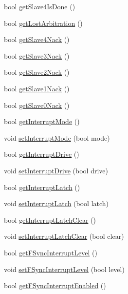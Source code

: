 \begin{DoxyCompactItemize}
\item 
bool \hyperlink{class_m_p_u6050_a105aefe645e7021f9ba4397e9df4114c}{get\+Slave4\+Is\+Done} ()
\item 
bool \hyperlink{class_m_p_u6050_acd775c72f85dabfc6f8fba43da096c6d}{get\+Lost\+Arbitration} ()
\item 
bool \hyperlink{class_m_p_u6050_ae9882b425cbdced4de325b608d896e10}{get\+Slave4\+Nack} ()
\item 
bool \hyperlink{class_m_p_u6050_a55f24d2f2b13d6e28a7c8b6bf2913520}{get\+Slave3\+Nack} ()
\item 
bool \hyperlink{class_m_p_u6050_af4b5101dab501d6df2e0cae909120771}{get\+Slave2\+Nack} ()
\item 
bool \hyperlink{class_m_p_u6050_a65cc9d75ff347b146414685fb83fa451}{get\+Slave1\+Nack} ()
\item 
bool \hyperlink{class_m_p_u6050_a74511edfcada3fb21c3327a0c846c72a}{get\+Slave0\+Nack} ()
\item 
bool \hyperlink{class_m_p_u6050_a58da1dfb39eb34e3a09a9b0bf4d87f29}{get\+Interrupt\+Mode} ()
\item 
void \hyperlink{class_m_p_u6050_a003a098a1521c5ef4df50c0a8a2d47ab}{set\+Interrupt\+Mode} (bool mode)
\item 
bool \hyperlink{class_m_p_u6050_af66e6c7b1885dcf452e73371790fddfd}{get\+Interrupt\+Drive} ()
\item 
void \hyperlink{class_m_p_u6050_a9d9d6aeea346e6f6fad8e4a428cf3301}{set\+Interrupt\+Drive} (bool drive)
\item 
bool \hyperlink{class_m_p_u6050_a5502c4c2a9bc4ea9267e128b7743923d}{get\+Interrupt\+Latch} ()
\item 
void \hyperlink{class_m_p_u6050_abf9ccf9eb6c7156e6660abb76734920a}{set\+Interrupt\+Latch} (bool latch)
\item 
bool \hyperlink{class_m_p_u6050_a9a098a607e20c64b60e155da35b8264f}{get\+Interrupt\+Latch\+Clear} ()
\item 
void \hyperlink{class_m_p_u6050_a2fa64c7030242aac18bd6727e8ca4a54}{set\+Interrupt\+Latch\+Clear} (bool clear)
\item 
bool \hyperlink{class_m_p_u6050_a60fc85d4f27f99d07ffb9543d5e5f347}{get\+F\+Sync\+Interrupt\+Level} ()
\item 
void \hyperlink{class_m_p_u6050_a2b1c75cfc29e8ff8205f4ff33a426716}{set\+F\+Sync\+Interrupt\+Level} (bool level)
\item 
bool \hyperlink{class_m_p_u6050_a4c01f9ab83b64dbbc6b62e658c3d3d9b}{get\+F\+Sync\+Interrupt\+Enabled} ()
\item 

\end{DoxyCompactItemize}
